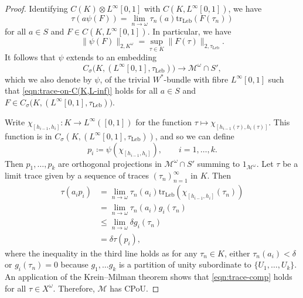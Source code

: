 \documentclass[a4paper,11pt]{amsart}
\theoremstyle{definition}
\numberwithin{equation}{section}
\numberwithin{theorem}{section}
\newcommand{\tr}{\mathrm{tr}}
\newcommand{\M}{\mathcal{M}}
\begin{document}
\begin{proof}
    Identifying $C(K) \otimes L^\infty[0, 1]$ with $C(K, L^\infty[0, 1])$, we have 
	\begin{equation}\label{eqn:trace-on-C(K,L-inf)}
		\tau(a\psi(F)) =\lim_{n\to\omega} \tau_n(a)\tr_{\mathrm{Leb}}(F(\tau_n))
	\end{equation} 
	for all $a \in S$ and $F \in C(K, L^\infty[0, 1])$.  In particular, we have \begin{equation}\|\psi(F)\|_{2,K^\omega} = \sup_{\tau \in K} \|F(\tau)\|_{2,\tau_{\mathrm{Leb}}}. \end{equation} It follows that $\psi$ extends to an embedding \begin{equation}
    C_\sigma\big(K, (L^\infty[0, 1],\tau_{\mathrm{Leb}})\big) \rightarrow \M^\omega \cap S',\end{equation}
    which we also denote by $\psi$, of the trivial $W^*$-bundle with fibre $L^\infty[0, 1]$ such that \eqref{eqn:trace-on-C(K,L-inf)} holds for all $a \in S$ and $F \in C_\sigma\big(K, (L^\infty[0, 1],\tau_{\mathrm{Leb}})\big)$. 
	
Write $\chi_{[h_{i-1},h_i]}\colon K \to L^\infty([0,1])$ for the function $\tau \mapsto \chi_{[h_{i-1}(\tau),h_i(\tau)]}$. This function is in $C_\sigma(K,(L^\infty[0,1],\tau_{\mathrm{Leb}}))$, and so we can define \begin{equation}
    p_i \coloneqq \psi(\chi_{[h_{i-1},h_i]}), \qquad i = 1, \dots, k.
\end{equation}
Then $p_1,\ldots ,p_k$ are orthogonal projections in $\M^\omega \cap S'$ summing to $1_{\M^\omega}$. Let $\tau$ be a limit trace given by a sequence of traces $(\tau_n)_{n=1}^\infty $ in $K$. Then
	\begin{equation}\begin{split}\label{eqn:trace-comp}
		\tau(a_ip_i) &= \lim_{n\to\omega} \tau_n(a_i)\tr_{\mathrm{Leb}}(\chi_{[h_{i-1},h_i]}(\tau_n))\\
		&= \lim_{n\to\omega} \tau_n(a_i)g_i(\tau_n)\\
		&\leq \lim_{n\to\omega}\delta g_i(\tau_n)\\
		&= \delta \tau(p_i),
	\end{split}\end{equation} 
where the inequality in the third line holds as for any $\tau_n \in K$, either $\tau_n(a_i) < \delta$ or $g_i(\tau_n) = 0$ because $g_1,\ldots g_k$ is a partition of unity subordinate to $\{U_1,\ldots,U_k\}$. An application of the Krein--Milman theorem shows that \eqref{eqn:trace-comp} holds for all $\tau \in X^\omega$. Therefore, $\M$ has CPoU.
\end{proof}
\end{document}
